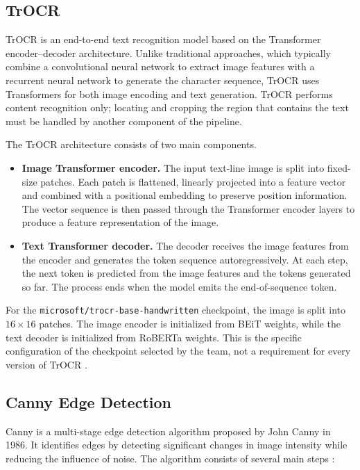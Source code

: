 \subsection{TrOCR}

TrOCR is an end-to-end text recognition model based on the Transformer encoder--decoder architecture. Unlike traditional approaches, which typically combine a convolutional neural network to extract image features with a recurrent neural network to generate the character sequence, TrOCR uses Transformers for both image encoding and text generation. TrOCR performs content recognition only; locating and cropping the region that contains the text must be handled by another component of the pipeline.

The TrOCR architecture consists of two main components.

\begin{itemize}
    \item \textbf{Image Transformer encoder.} The input text-line image is split into fixed-size patches. Each patch is flattened, linearly projected into a feature vector and combined with a positional embedding to preserve position information. The vector sequence is then passed through the Transformer encoder layers to produce a feature representation of the image.

    \item \textbf{Text Transformer decoder.} The decoder receives the image features from the encoder and generates the token sequence autoregressively. At each step, the next token is predicted from the image features and the tokens generated so far. The process ends when the model emits the end-of-sequence token.
\end{itemize}

For the \texttt{microsoft/trocr-base-handwritten} checkpoint, the image is split into $16 \times 16$ patches. The image encoder is initialized from BEiT weights, while the text decoder is initialized from RoBERTa weights. This is the specific configuration of the checkpoint selected by the team, not a requirement for every version of TrOCR \cite{hf_trocr}.

\subsection{Canny Edge Detection}

Canny is a multi-stage edge detection algorithm proposed by John Canny in 1986. It identifies edges by detecting significant changes in image intensity while reducing the influence of noise. The algorithm consists of several main steps \cite{canny1986}:

